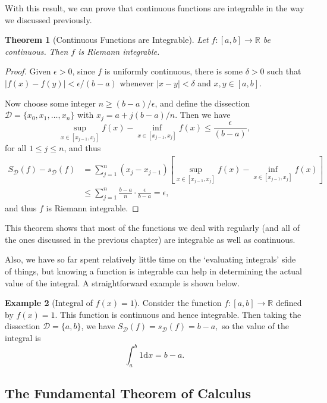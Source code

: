 \documentclass[11pt, a4paper]{article}
\newtheorem{theorem}{Theorem}[section]
\theoremstyle{definition}
\newtheorem{example}[theorem]{Example}
\newcommand{\R}{\mathbb{R}}
\newcommand{\DD}{\mathcal{D}}
\newcommand{\dd}{\mathrm{d}}
\begin{document}
With this result, we can prove that continuous functions are integrable in the way we discussed previously.


\begin{theorem}[Continuous Functions are Integrable]
	Let $f:[a, b] \rightarrow \R$ be continuous. Then $f$ is Riemann integrable.
\end{theorem}
\begin{proof}
	Given $\epsilon > 0$, since $f$ is uniformly continuous, there is some $\delta > 0$ such that $|f(x) - f(y)| < \epsilon/(b - a)$ whenever $|x - y| < \delta$ and $x, y \in [a, b]$.

	Now choose some integer $n \geq (b - a)/\epsilon$, and define the dissection $\DD = \{x_0, x_1, \dots, x_n\}$ with $x_j = a + j(b - a)/n$. Then we have
	$$
	\sup_{x \in [x_{j - 1}, x_j]} f(x) - \inf_{x \in [x_{j - 1}, x_j]} f(x) \leq \frac{\epsilon}{(b - a)},
	$$
	for all $1 \leq j \leq n$, and thus 
	\begin{align*}
		S_\DD(f) - s_\DD(f) &= \sum_{j = 1}^n (x_j - x_{j - 1})\left[\sup_{x \in [x_{j - 1}, x_j]} f(x) - \inf_{x \in [x_{j - 1}, x_j]} f(x)\right] \\
		&\leq \sum_{j = 1}^n \frac{b - a}{n} \cdot \frac{\epsilon}{b - a} = \epsilon,
	\end{align*}
	and thus $f$ is Riemann integrable.
\end{proof}

This theorem shows that most of the functions we deal with regularly (and all of the ones discussed in the previous chapter) are integrable as well as continuous.


Also, we have so far spent relatively little time on the `evaluating integrals' side of things, but knowing a function is integrable can help in determining the actual value of the integral. A straightforward example is shown below.

\begin{example}[Integral of $f(x) = 1$]
	Consider the function $f:[a, b] \rightarrow \R$ defined by $f(x) = 1$. This function is continuous and hence integrable. Then taking the dissection $\DD = \{a, b\}$, we have
	$
	S_{\DD}(f) = s_{\DD}(f) = b - a,
	$ so the value of the integral is
	$$
	\int_a^b 1 \dd x = b - a.
	$$
\end{example}


\subsection{The Fundamental Theorem of Calculus}
\end{document}
